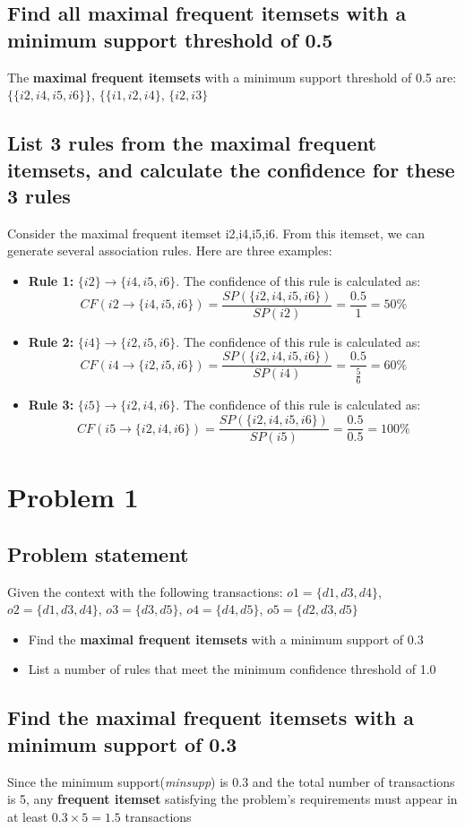 \subsection{Find all \textbf{maximal frequent itemsets} with a minimum support threshold of 0.5}
The \textbf{maximal frequent itemsets} with a minimum support threshold of 0.5 are:\\ \(\{\{i2,i4,i5,i6\}\}\), \(\{\{i1,i2,i4\}\), \(\{i2,i3\}\)
\subsection{List 3 rules from the maximal frequent itemsets, and calculate the \textbf{confidence} for these 3 rules}
Consider the maximal frequent itemset {i2,i4,i5,i6}. From this itemset, we can generate several association rules. Here are three examples:
\begin{itemize}
\item \textbf{Rule 1:} \(\{i2\} \rightarrow \{i4,i5,i6\}\). The confidence of this rule is calculated as: \[CF(i2 \rightarrow \{i4,i5,i6\}) = \frac{SP(\{i2, i4, i5, i6\})}{SP(i2)} = \frac{0.5}{1} = 50\%\]
\item \textbf{Rule 2:} \(\{i4\} \rightarrow \{i2,i5,i6\}\). The confidence of this rule is calculated as: \[CF(i4 \rightarrow \{i2,i5,i6\}) = \frac{SP(\{i2,i4,i5,i6\})}{SP(i4)} = \frac{0.5}{\frac{5}{6}} = 60\%\]
\item \textbf{Rule 3:} \(\{i5\} \rightarrow \{i2,i4,i6\}\). The confidence of this rule is calculated as: \[CF(i5 \rightarrow \{i2,i4,i6\}) = \frac{SP(\{i2,i4,i5,i6\})}{SP(i5)} = \frac{0.5}{0.5} = 100\%\]
\end{itemize}
\section{Problem 1}
\subsection{Problem statement}
Given the context with the following transactions: \(o1 = \{d1,d3,d4\}\), \(o2 = \{d1,d3,d4\}\), \(o3 = \{d3,d5\}\), \(o4 = \{d4,d5\}\), \(o5 = \{d2,d3,d5\}\)
\begin{itemize}
\item Find the \textbf{maximal frequent itemsets} with a minimum support of 0.3
\item List a number of rules that meet the minimum confidence threshold of 1.0
\end{itemize}
\subsection{Find the \textbf{maximal frequent itemsets} with a minimum support of 0.3}
Since the minimum support(\textit{minsupp}) is 0.3 and the total number of transactions is 5, any \textbf{frequent itemset} satisfying the problem's requirements must appear in at least \(0.3 \times 5 = 1.5\) transactions
